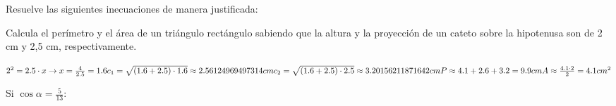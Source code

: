 \documentclass[addpoints,spanish, 12pt,a4paper]{exam}
\begin{document}
\begin{questions}

\question Resuelve las siguientes inecuaciones de manera justificada:
\begin{parts}

\part[1]$ x^{3}  + x <  2 x^{2} $
\begin{solution} $\left(-\infty, 0\right)$ \end{solution}


\part[2]$\dfrac{x - 1}{x^{2} + x}\geqslant 0$  
\begin{solution} $\left(-1, 0\right) \cup \left[1, \infty\right)$ \end{solution}


\end{parts}

\addpoints

\question[2] 
Calcula el perímetro y el área de un triángulo rectángulo sabiendo que la altura y la proyección de un cateto sobre la hipotenusa son de 2 cm y 2,5 cm, respectivamente.
\begin{solution}
$ 2^2=2.5\cdot x \to x=\frac{4}{2.5}=1.6 \\
c_1=\sqrt{\left(1.6+2.5\right)\cdot 1.6}\approx2.56124969497314 cm\\
c_2=\sqrt{\left(1.6+2.5\right)\cdot 2.5}\approx3.20156211871642 cm\\
P\approx 4.1+2.6+3.2=9.9cm\\
A\approx\frac{4.1\cdot2}{2}=4.1 cm^2 
$
\end{solution}

\question Si $\cos \alpha = \frac{5}{13}$:
\begin{parts} 

\end{parts}
\end{questions}
\end{document}
